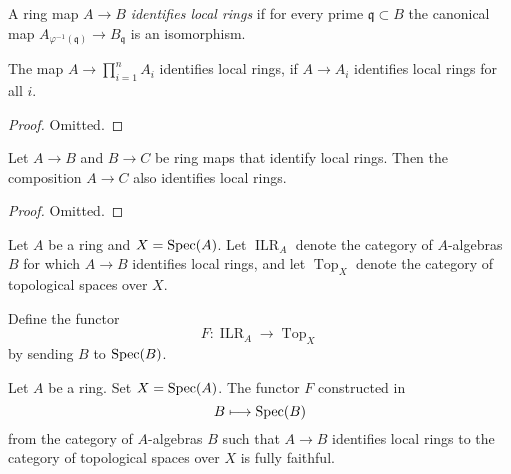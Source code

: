 \begin{definition}
  A ring map $A \to B$ \emph{identifies local rings} if for every prime $\mathfrak{q} \subset B$ the canonical map $A_{\varphi^{-1}(\mathfrak{q})} \to B_{\mathfrak{q}}$ is an isomorphism.
  \label{def:identify-local-rings}
  \leanok
\end{definition}

\begin{lemma}
  \label{thm:finite-product-identifies-local-rings}
  The map \(A \to \prod_{i = 1}^{n} A_i \) identifies local rings, if \(A \to A_i\) identifies local rings for all \(i\).
\end{lemma}

\begin{proof}
  Omitted.
\end{proof}

\begin{lemma}
  \label{thm:identifies-local-rings-composition}
  Let \(A \to B\) and \(B \to C\) be ring maps that identify local rings. Then the composition \(A \to C\) also identifies local rings.
\end{lemma}

\begin{proof}
  Omitted.
\end{proof}

\begin{definition}{\cite[\href{https://stacks.math.columbia.edu/tag/096L}{Tag 096L}]{stacks-project}}
  \label{def:identifies-local-ring-to-top}
  Let $A$ be a ring and $X = \operatorname{Spec}(A)$. Let $\operatorname{ILR}_A$ denote the category of $A$-algebras $B$ for which $A \to B$ identifies local rings, and let $\operatorname{Top}_X$ denote the category of topological spaces over $X$.
  
  Define the functor
  \[
  F \colon \operatorname{ILR}_A \longrightarrow \operatorname{Top}_X
  \]
  by sending $B$ to $\operatorname{Spec}(B)$.
\end{definition}

\begin{lemma}{\cite[\href{https://stacks.math.columbia.edu/tag/096L}{Tag 096L}]{stacks-project}}
  \label{thm:identifies-local-ring-to-top-fully-faithful}
  Let $A$ be a ring. Set $X = \operatorname{Spec} (A)$. The functor \(F\) constructed in 
  \[
  B \longmapsto \operatorname{Spec} (B)
  \]
  from the category of $A$-algebras $B$ such that $A \to B$ identifies local rings to the category of topological spaces over $X$ is fully faithful.
\end{lemma}

